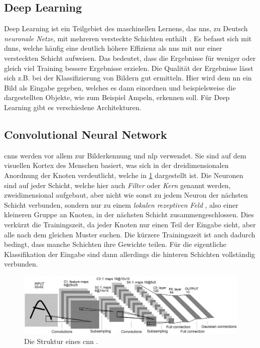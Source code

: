 \subsection{Deep Learning}
Deep Learning ist ein Teilgebiet des maschinellen Lernens, das \acp{nn}, zu Deutsch \emph{neuronale Netze}, mit mehreren versteckte Schichten enthält \citep{deeplearningreview}.
Es befasst sich mit \acp{dnn}, welche häufig eine deutlich höhere Effizienz als \acp{nn} mit nur einer versteckten Schicht aufweisen.
Das bedeutet, dass die Ergebnisse für weniger oder gleich viel Training bessere Ergebnisse erzielen.
Die Qualität der Ergebnisse lässt sich z.B. bei der Klassifizierung von Bildern gut ermitteln.
Hier wird dem \ac{nn} ein Bild als Eingabe gegeben, welches es dann einordnen und beispielsweise die dargestellten Objekte, wie zum Beispiel Ampeln, erkennen soll.
Für Deep Learning gibt es verschiedene Architekturen.

\subsection{Convolutional Neural Network}
\acp{cnn} werden vor allem zur Bilderkennung und \ac{nlp} verwendet.
Sie sind auf dem visuellen Kortex des Menschen basiert, was sich in der dreidimensionalen Anordnung der Knoten verdeutlicht,
welche in \cref{fig:struktur-cnn} dargestellt ist.
Die Neuronen sind auf jeder Schicht, welche hier auch \emph{Filter} oder \emph{Kern} genannt werden,
zweidimensional aufgebaut, aber nicht wie sonst zu jedem Neuron der nächsten Schicht verbunden,
sondern nur zu einem \emph{lokalen rezeptiven Feld} \citep{deeplearningnature},
also einer kleineren Gruppe an Knoten, in der nächsten Schicht zusammengeschlossen.
Dies verkürzt die Trainingszeit, da jeder Knoten nur einen Teil der Eingabe sieht, aber alle nach dem gleichen Muster suchen.
Die kürzere Trainingszeit ist auch dadurch bedingt, dass manche Schichten ihre Gewichte teilen.
Für die eigentliche Klassifikation der Eingabe sind dann allerdings die hinteren Schichten vollständig verbunden.
\begin{figure}%
\centering
\includegraphics[width=\textwidth, height=\textheight, keepaspectratio]{Images/CNN.png}
\caption[Struktur von CNNs]{Die Struktur eines \ac{cnn} \citep{deeplearningarchitecturesreview}.}
\label{fig:struktur-cnn}
\end{figure}

